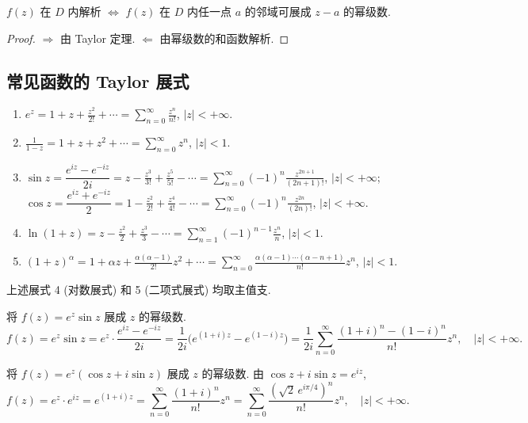\documentclass[theorem=false,mathfont=none,openany,sub3section]{easybook}
\begin{document}
\begin{corollary}
  $f(z)$ 在 $D$ 内解析 $\Leftrightarrow$ $f(z)$ 在 $D$ 内任一点 $a$ 的邻域可展成 $z-a$ 的幂级数.
\end{corollary}

\begin{proof}
  $\Rightarrow$ 由 Taylor 定理. $\Leftarrow$ 由幂级数的和函数解析.
\end{proof}

\subsection{常见函数的 Taylor 展式}

\begin{enumerate}
  \item $e^{z}=1+z+\frac{z^{2}}{2!}+\cdots=\sum_{n=0}^{\infty}\frac{z^{n}}{n!}$, $|z|<+\infty$.
  \item $\frac{1}{1-z}=1+z+z^{2}+\cdots=\sum_{n=0}^{\infty}z^{n}$, $|z|<1$.
  \item $\sin z=\dfrac{e^{iz}-e^{-iz}}{2i}=z-\frac{z^{3}}{3!}+\frac{z^{5}}{5!}-\cdots=\sum_{n=0}^{\infty}(-1)^{n}\frac{z^{2n+1}}{(2n+1)!}$, $|z|<+\infty$;
  $\cos z=\dfrac{e^{iz}+e^{-iz}}{2}=1-\frac{z^{2}}{2!}+\frac{z^{4}}{4!}-\cdots=\sum_{n=0}^{\infty}(-1)^{n}\frac{z^{2n}}{(2n)!}$, $|z|<+\infty$.
  \item $\ln(1+z)=z-\frac{z^{2}}{2}+\frac{z^{3}}{3}-\cdots=\sum_{n=1}^{\infty}(-1)^{n-1}\frac{z^{n}}{n}$, $|z|<1$.
  \item $(1+z)^{\alpha}=1+\alpha z+\frac{\alpha(\alpha-1)}{2!}z^{2}+\cdots=\sum_{n=0}^{\infty}\frac{\alpha(\alpha-1)\cdots(\alpha-n+1)}{n!}z^{n}$, $|z|<1$.
\end{enumerate}

\begin{remark}
  上述展式 4 (对数展式) 和 5 (二项式展式) 均取主值支.
\end{remark}

\begin{example}
  将 $f(z)=e^{z}\sin z$ 展成 $z$ 的幂级数.
  \[
  f(z)=e^{z}\sin z=e^{z}\cdot\frac{e^{iz}-e^{-iz}}{2i}
  =\frac{1}{2i}\bigl(e^{(1+i)z}-e^{(1-i)z}\bigr)
  =\frac{1}{2i}\sum_{n=0}^{\infty}\frac{(1+i)^{n}-(1-i)^{n}}{n!}z^{n},\quad|z|<+\infty.
  \]
\end{example}

\begin{example}
  将 $f(z)=e^{z}(\cos z+i\sin z)$ 展成 $z$ 的幂级数. 由 $\cos z+i\sin z=e^{iz}$,
  \[
  f(z)=e^{z}\cdot e^{iz}=e^{(1+i)z}=\sum_{n=0}^{\infty}\frac{(1+i)^{n}}{n!}z^{n}
  =\sum_{n=0}^{\infty}\frac{(\sqrt{2}\,e^{i\pi/4})^{n}}{n!}z^{n},\quad |z|<+\infty.
  \]
\end{example}
\end{document}

